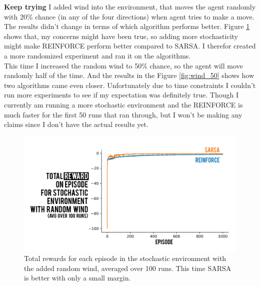 \documentclass[10pt, letterpaper, twocolumn]{article}
\begin{document}
	\textbf{Keep trying} I added wind into the environment, that moves the agent randomly with 20\% chance (in any of the four directions) when agent tries to make a move. The results didn't change in terms of which algorithm performs better. Figure \ref{fig:wind} shows that, my concerns might have been true, so adding more stochasticity might make REINFORCE perform better compared to SARSA. I therefor created a more randomized experiment and ran it on the algorithms. \\
	
	This time I increased the random wind to 50\% chance, so the agent will move randomly half of the time. And the results in the Figure \ref{fig:wind_50} shows how two algorithms came even closer. Unfortunately due to time constraints I couldn't run more experiments to see if my expectation was definitely true. Though I currently am running a more stochastic environment and the REINFORCE is much faster for the first 50 runs that ran through, but I won't be making any claims since I don't have the actual results yet.
			
	\begin{figure}[h]
		\centering
		\includegraphics[width=\linewidth]{figure_wind}
		\caption{\small Total rewards for each episode in the stochastic environment with the added random wind, averaged over 100 runs. This time SARSA is better with only a small margin.}
		\label{fig:wind}
	\end{figure}
\end{document}

